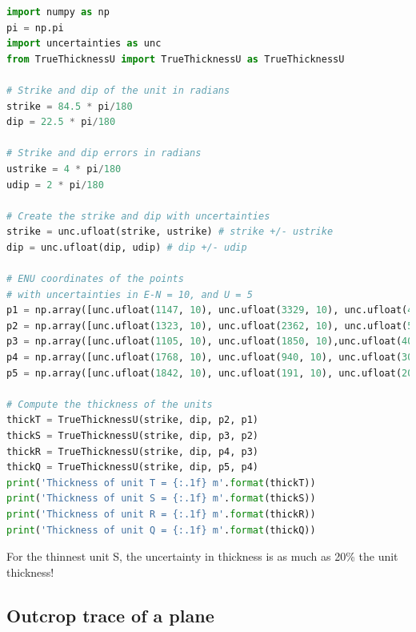 \documentclass[a4paper , 12pt]{book}
\begin{document}
\begin{center}
\begin{lstlisting}[language=Python, frame=single]
import numpy as np
pi = np.pi
import uncertainties as unc
from TrueThicknessU import TrueThicknessU as TrueThicknessU

# Strike and dip of the unit in radians
strike = 84.5 * pi/180
dip = 22.5 * pi/180

# Strike and dip errors in radians
ustrike = 4 * pi/180
udip = 2 * pi/180

# Create the strike and dip with uncertainties
strike = unc.ufloat(strike, ustrike) # strike +/- ustrike
dip = unc.ufloat(dip, udip) # dip +/- udip

# ENU coordinates of the points
# with uncertainties in E-N = 10, and U = 5
p1 = np.array([unc.ufloat(1147, 10), unc.ufloat(3329, 10), unc.ufloat(400, 5)]) 
p2 = np.array([unc.ufloat(1323, 10), unc.ufloat(2362, 10), unc.ufloat(500, 5)]) 
p3 = np.array([unc.ufloat(1105, 10), unc.ufloat(1850, 10),unc.ufloat(400, 5)]) 
p4 = np.array([unc.ufloat(1768, 10), unc.ufloat(940, 10), unc.ufloat(300, 5)]) 
p5 = np.array([unc.ufloat(1842, 10), unc.ufloat(191, 10), unc.ufloat(200, 5)])

# Compute the thickness of the units
thickT = TrueThicknessU(strike, dip, p2, p1)
thickS = TrueThicknessU(strike, dip, p3, p2)
thickR = TrueThicknessU(strike, dip, p4, p3)
thickQ = TrueThicknessU(strike, dip, p5, p4) 
print('Thickness of unit T = {:.1f} m'.format(thickT))
print('Thickness of unit S = {:.1f} m'.format(thickS))
print('Thickness of unit R = {:.1f} m'.format(thickR))
print('Thickness of unit Q = {:.1f} m'.format(thickQ))
\end{lstlisting}
\end{center}

For the thinnest unit S, the uncertainty in thickness is as much as 20\% the unit thickness!

\subsection{Outcrop trace of a plane}
\end{document}
